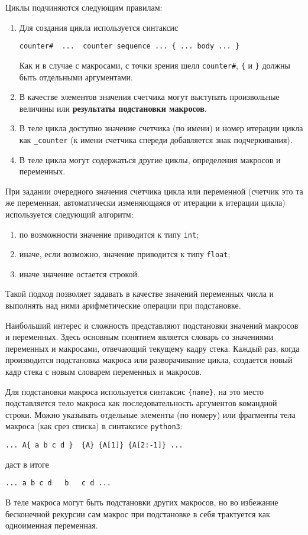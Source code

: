 \documentclass[12pt]{article}
\def\python{{\tt python3}}
\begin{document}
Циклы подчиняются следующим правилам:
\begin{enumerate}
\item Для создания цикла используется синтаксис
\begin{verbatim}
counter#  ...  counter sequence ... { ... body ... }
\end{verbatim}
Как и в случае с макросами, с точки зрения шелл \verb'counter#', \verb'{' и \verb'}' должны быть отдельными аргументами.
\item В качестве элементов значения счетчика могут выступать произвольные величины или {\bf результаты подстановки макросов}.
\item В теле цикла доступно значение счетчика (по имени) и номер итерации цикла как \verb'_counter' (к имени счетчика спереди добавляется знак подчеркивания).
\item В теле цикла могут содержаться другие циклы, определения макросов и переменных.
\end{enumerate}

При задании очередного значения счетчика цикла или переменной (счетчик это та же переменная, автоматически изменяющаяся от итерации к итерации цикла)
используется следующий алгоритм:
\begin{enumerate}
\item по возможности значение приводится к типу \verb'int';
\item иначе, если возможно, значение приводится к типу \verb'float';
\item иначе значение остается строкой.
\end{enumerate}
Такой подход позволяет задавать в качестве значений переменных числа и выполнять над ними арифметические операции при подстановке.

Наибольший интерес и сложность представляют подстановки значений макросов и переменных. Здесь основным понятием является словарь со значениями
переменных и макросами, отвечающий текущему кадру стека. 
Каждый раз, когда производится подстановка макроса или разворачивание цикла, создается новый кадр стека с новым словарем переменных и макросов.

Для подстановки макроса используется синтаксис \verb'{name}', на это место подставляется тело макроса как последовательность аргументов командной строки.
Можно указывать отдельные элементы (по номеру) или фрагменты тела макроса (как срез списка) в синтаксисе \python:
\begin{verbatim}
... A{ a b c d }  {A} {A[1]} {A[2:-1]} ...
\end{verbatim}
даст в итоге
\begin{verbatim}
... a b c d   b   c d ...
\end{verbatim}
В теле макроса могут быть подстановки других макросов, но во избежание бесконечной рекурсии сам макрос при подстановке в себя трактуется как
одноименная переменная.
\end{document}
